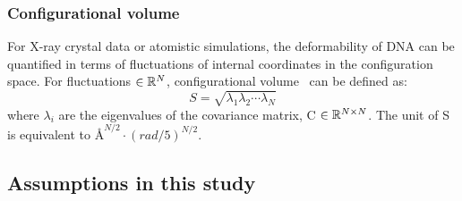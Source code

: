 \subsubsection{Configurational volume}\label{ss:con_vol}
For X-ray crystal data or atomistic simulations, the deformability of DNA can be quantified in terms of fluctuations of internal coordinates in the configuration space.
For fluctuations $\in {\mathbb R}^N$, configurational volume~\cite{xraydata,olson2006dna} can be defined as:
\begin{equation}
S = \sqrt{\lambda_1\lambda_2 \cdots \lambda_N}
\label{eq:eq2}
\end{equation}
where $\lambda_i$ are the eigenvalues of the covariance matrix, C $\in {\mathbb R}^{N \times N}$.
The unit of S is equivalent to $\text{\AA}^{N/2}\cdot(rad/5)^{N/2}$.

\subsection{Assumptions in this study}\label{ss:limitation}
